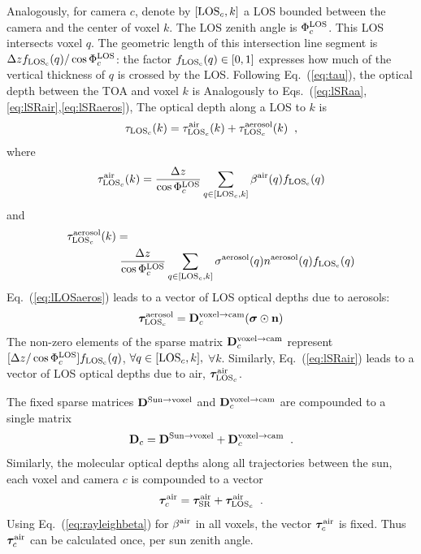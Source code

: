\documentclass[10pt,twocolumn,letterpaper]{article}
\newcommand{\vect}[1]{\bm{#1}}
\begin{document}
Analogously, for camera $c$, denote by $[{\rm LOS}_c,k]$
a LOS bounded between the camera and the center of voxel $k$. The LOS zenith angle is $\Phi^{\rm LOS}_c$.
This LOS intersects voxel $q$. The geometric length of this intersection
line segment is $\Delta z f_{\rm LOS_c}(q)/\cos\Phi^{\rm LOS}_c$: the factor
$f_{\rm LOS_c}(q)\in [0,1]$ expresses how much of the vertical thickness of $q$ is crossed by the LOS.
Following Eq.~(\ref{eq:tau}), the optical depth between the TOA and voxel $k$ is
Analogously to Eqs.~(\ref{eq:lSRaa},\ref{eq:lSRair},\ref{eq:lSRaeros}),
The optical depth %
along a LOS to $k$ is
\begin{equation}
  \tau_{{\rm LOS}_c}(k)=
   \tau_{{\rm LOS}_c}^{\rm air}(k) +  \tau_{{\rm LOS}_c}^{\rm aerosol}(k)
  \;\;,
  \label{eq:lLOSaero}
\end{equation}
where
\begin{equation}
  \tau_{{\rm LOS}_c}^{\rm air}(k)=\frac{\Delta z}{\cos\Phi^{\rm LOS}_c}
     \sum_{q \in[{\rm LOS}_c,k]}
     \beta^{\rm air}(q)  f_{\rm LOS_c}(q)
  \label{eq:lLOSaero}
\end{equation}
and
\begin{align}
  \label{eq:lLOSaeros}
  \tau_{{\rm LOS}_c}^{\rm aerosol}(k)=
  ~~~~~~~~~~~~~~~~~~~~~~~~~~~~~~~~~~~~~
  ~~~~~~~~~~~~~~~~~~%
  ~~~~~
  \\
   \frac{\Delta z}{\cos\Phi^{\rm LOS}_c}
     \sum_{q \in[{\rm LOS}_c,k]}
     \sigma^{\rm aerosol}(q) n^{\rm aerosol}(q) f_{\rm LOS_c}(q)
     \nonumber
\end{align}
Eq.~(\ref{eq:lLOSaeros}) leads to a vector of LOS optical depths due to aerosols:
\begin{equation}
  \vect{\tau}_{{\rm LOS}_c}^{\rm aerosol}=
  {\bf D}^{\mathrm{voxel \rightarrow cam}}_c
     (\vect{\sigma} \odot {\bf n})
  \label{eq:tauLOSvec1}
\end{equation}
The non-zero elements of the sparse matrix ${\bf D}^{\mathrm{voxel \rightarrow cam}}_c$
represent $[\Delta z/\cos\Phi^{\rm LOS}_c]f_{\rm LOS_c}(q)$,
\mbox{$\forall q \in[{\rm LOS}_c,k],$} $\forall k$.
Similarly, Eq.~(\ref{eq:lSRair}) leads to a vector of LOS optical depths due to air,
$\vect{\tau}_{{\rm LOS}_c}^{\rm air}$.

The fixed sparse matrices ${\bf D}^{\mathrm{Sun \rightarrow voxel}}$ and
${\bf D}^{\mathrm{voxel \rightarrow cam}}_c$ are compounded to a single matrix
\begin{equation}
  {\bf D}_c=
  {\bf D}^{\mathrm{Sun \rightarrow voxel}}+
  {\bf D}^{\mathrm{voxel \rightarrow cam}}_c
  \;\;.
  \label{eq:Dtotal}
\end{equation}
Similarly, the molecular optical depths along all trajectories between the sun, each voxel
and camera $c$ is compounded to a vector
\begin{equation}
  \vect{\tau}_c^{\rm air}=
  \vect{\tau}_{\rm SR}^{\rm air}+
  \vect{\tau}_{{\rm LOS}_c}^{\rm air}
  \;\;.
  \label{eq:tauairtotal}
\end{equation}
Using Eq.~(\ref{eq:rayleighbeta}) for $\beta^{\rm air}$ in all voxels,
the vector $\vect{\tau}_c^{\rm air}$ is fixed. Thus $\vect{\tau}_c^{\rm air}$ can
be calculated once, per sun zenith angle.
\end{document}

